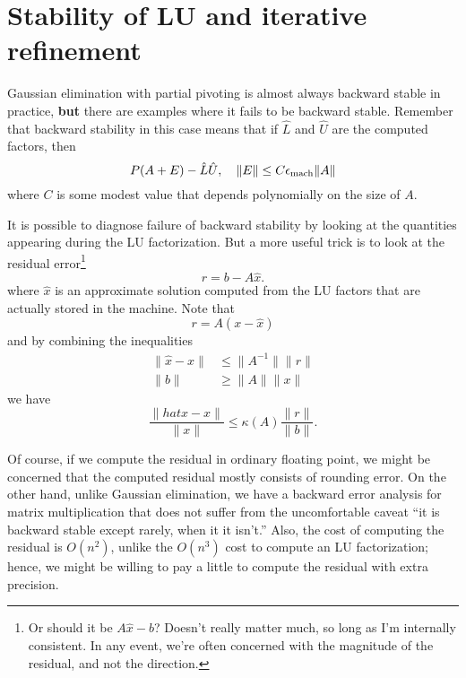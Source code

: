 \documentclass[12pt, leqno]{article}
\begin{document}

\section*{Stability of LU and iterative refinement}

Gaussian elimination with partial pivoting is almost always backward
stable in practice, {\bf but} there are examples where it fails to be
backward stable.  Remember that backward stability in this case
means that if $\hat L$ and $\hat U$ are the computed factors, then
\[
  P(A+E)-\hat L \hat U, \quad \|E\| \leq C \epsilon_{\mathrm{mach}} \|A\|
\]
where $C$ is some modest value that depends polynomially on the size
of $A$.

It is possible to diagnose failure of backward stability by looking
at the quantities appearing during the LU factorization.  But a more
useful trick is to look at the residual error\footnote{%
  Or should it be $A \hat{x}-b$?  Doesn't really matter much, so
  long as I'm internally consistent.  In any event, we're often
  concerned with the magnitude of the residual, and not the direction.
}
\[
  r = b-A \hat x.
\]
where $\hat x$ is an approximate solution computed from the LU factors
that are actually stored in the machine.  Note that
\[
  r = A(x-\hat{x})
\]
and by combining the inequalities
\begin{align*}
  \|\hat x-x\| &\leq \|A^{-1}\| \|r\| \\
  \|b\| & \geq \|A\| \|x\|
\end{align*}
we have
\[
  \frac{\|hat x-x\|}{\|x\|} \leq
  \kappa(A) \frac{\|r\|}{\|b\|}.
\]

Of course, if we compute the residual in ordinary floating point, we
might be concerned that the computed residual mostly consists of
rounding error.  On the other hand, unlike Gaussian elimination, we
have a backward error analysis for matrix multiplication that does not
suffer from the uncomfortable caveat ``it is backward stable except rarely,
when it it isn't.''  Also, the cost of computing the residual is
$O(n^2)$, unlike the $O(n^3)$ cost to compute an LU factorization;
hence, we might be willing to pay a little to compute the residual
with extra precision.
\end{document}
